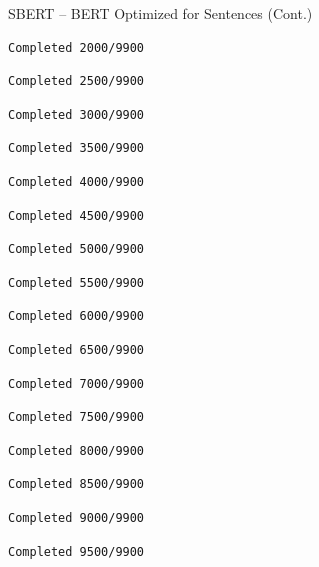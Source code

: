 \documentclass[
  ignorenonframetext,
  aspectratio=169]{beamer}
\begin{document}
\begin{frame}[fragile]{SBERT -- BERT Optimized for Sentences (Cont.)}
\begin{verbatim}
Completed 2000/9900
\end{verbatim}

\begin{verbatim}
Completed 2500/9900
\end{verbatim}

\begin{verbatim}
Completed 3000/9900
\end{verbatim}

\begin{verbatim}
Completed 3500/9900
\end{verbatim}

\begin{verbatim}
Completed 4000/9900
\end{verbatim}

\begin{verbatim}
Completed 4500/9900
\end{verbatim}

\begin{verbatim}
Completed 5000/9900
\end{verbatim}

\begin{verbatim}
Completed 5500/9900
\end{verbatim}

\begin{verbatim}
Completed 6000/9900
\end{verbatim}

\begin{verbatim}
Completed 6500/9900
\end{verbatim}

\begin{verbatim}
Completed 7000/9900
\end{verbatim}

\begin{verbatim}
Completed 7500/9900
\end{verbatim}

\begin{verbatim}
Completed 8000/9900
\end{verbatim}

\begin{verbatim}
Completed 8500/9900
\end{verbatim}

\begin{verbatim}
Completed 9000/9900
\end{verbatim}

\begin{verbatim}
Completed 9500/9900
\end{verbatim}
\end{frame}
\end{document}
